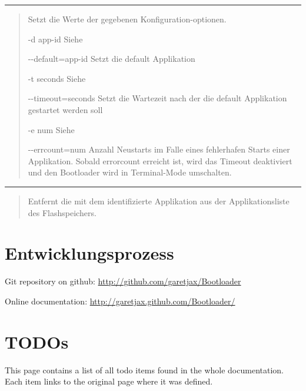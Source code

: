 \documentclass[letterpaper,10pt,ngerman]{manual}
\begin{document}
\bigskip\hrule{}\bigskip


\begin{quote}

Setzt die Werte der gegebenen Konfiguration-optionen.
\begin{optionlist}{3cm}
\item [-d app-id]  
Siehe 
\item [-{-}default=app-id]  
Setzt die default Applikation
\item [-t seconds]  
Siehe 
\item [-{-}timeout=seconds]  
Setzt die Wartezeit nach der die default Applikation gestartet werden soll
\item [-e num]  
Siehe 
\item [-{-}errcount=num]  
Anzahl Neustarts im Falle eines fehlerhafen Starts einer Applikation.  Sobald errorcount erreicht ist, wird das Timeout deaktiviert und den Bootloader wird in Terminal-Mode umschalten.
\end{optionlist}
\end{quote}


\bigskip\hrule{}\bigskip


\begin{quote}

Entfernt die mit dem  identifizierte Applikation aus der Applikationsliste des Flashspeichers.
\end{quote}

\resetcurrentobjects
\hypertarget{--doc-development}{}

\chapter{Entwicklungsprozess}

Git repository on github: \href{http://github.com/garetjax/Bootloader}{http://github.com/garetjax/Bootloader}

Online documentation: \href{http://garetjax.github.com/Bootloader/}{http://garetjax.github.com/Bootloader/}

\resetcurrentobjects
\hypertarget{--doc-todos}{}

\chapter{TODOs}

This page contains a list of all todo items found in the whole documentation.
Each item links to the original page where it was defined.
\end{document}
